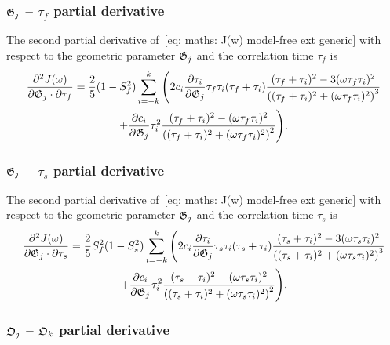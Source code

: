 \subsubsection{$\mathfrak{G}_j$ -- $\tau_f$ partial derivative}

The second partial derivative of~\eqref{eq: maths: J(w) model-free ext generic} with respect to the geometric parameter $\mathfrak{G}_j$ and the correlation time $\tau_f$ is
\begin{multline}
    \frac{\partial^2 J(\omega)}{\partial \mathfrak{G}_j \cdot \partial \tau_f} = \frac{2}{5} (1 - S^2_f) \sum_{i=-k}^k \Bigg(
        2 c_i \frac{\partial \tau_i}{\partial \mathfrak{G}_j} \tau_f \tau_i (\tau_f + \tau_i)
            \frac{(\tau_f + \tau_i)^2 - 3(\omega \tau_f \tau_i)^2}{\left((\tau_f + \tau_i)^2 + (\omega \tau_f \tau_i)^2 \right)^3}  \\
        + \frac{\partial c_i}{\partial \mathfrak{G}_j} \tau_i^2 \frac{(\tau_f + \tau_i)^2 - (\omega \tau_f \tau_i)^2}{\left((\tau_f + \tau_i)^2 + (\omega \tau_f \tau_i)^2 \right)^2}
    \Bigg).
\end{multline}



\subsubsection{$\mathfrak{G}_j$ -- $\tau_s$ partial derivative}

The second partial derivative of~\eqref{eq: maths: J(w) model-free ext generic} with respect to the geometric parameter $\mathfrak{G}_j$ and the correlation time $\tau_s$ is
\begin{multline}
    \frac{\partial^2 J(\omega)}{\partial \mathfrak{G}_j \cdot \partial \tau_s} = \frac{2}{5} S^2_f(1 - S^2_s) \sum_{i=-k}^k \Bigg(
        2 c_i \frac{\partial \tau_i}{\partial \mathfrak{G}_j} \tau_s \tau_i (\tau_s + \tau_i)
            \frac{(\tau_s + \tau_i)^2 - 3(\omega \tau_s \tau_i)^2}{\left((\tau_s + \tau_i)^2 + (\omega \tau_s \tau_i)^2 \right)^3}  \\
        + \frac{\partial c_i}{\partial \mathfrak{G}_j} \tau_i^2 \frac{(\tau_s + \tau_i)^2 - (\omega \tau_s \tau_i)^2}{\left((\tau_s + \tau_i)^2 + (\omega \tau_s \tau_i)^2 \right)^2}
    \Bigg).
\end{multline}



\subsubsection{$\mathfrak{O}_j$ -- $\mathfrak{O}_k$ partial derivative}

